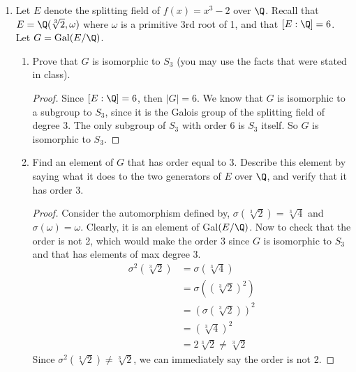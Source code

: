 \documentclass[12pt]{article}
\begin{document}
\begin{enumerate}
\begin{enumerate}
		\end{enumerate}
		
		\item Let $E$ denote the splitting field of $f(x) = x^3 - 2$ over $\Q$. Recall that $E = \Q(\sqrt[3]{2}, \omega)$ where $\omega$ is a primitive 3rd root of 1, and that $[E : \Q] = 6$. Let $G = \text{Gal}(E/\Q)$.
		\begin{enumerate}
			\item Prove that $G$ is isomorphic to $S_3$ (you may use the facts that were stated in class).
			\begin{proof}
				Since $[E:\Q] = 6$, then $|G| = 6$. We know that $G$ is isomorphic to a subgroup to $S_3$, since it is the Galois group of the splitting field of degree 3. The only subgroup of $S_3$ with order $6$ is $S_3$ itself. So $G$ is isomorphic to $S_3$.
			\end{proof}
		
			\item Find an element of $G$ that has order equal to 3. Describe this element by saying what it does to the two generators of $E$ over $\Q$, and verify that it has order 3.
			\begin{proof}
				Consider the automorphism defined by, $\sigma(\sqrt[3]{2}) = \sqrt[3]{4}$ and $\sigma(\omega)=\omega$. Clearly, it is an element of Gal$(E/\Q)$. Now to check that the order is not 2, which would make the order 3 since $G$ is isomorphic to $S_3$ and that has elements of max degree 3.\\
				\begin{align*}
					\sigma^2(\sqrt[3]{2}) &= \sigma(\sqrt[3]{4})\\
					 &= \sigma((\sqrt[3]{2})^2)\\
					 &= (\sigma(\sqrt[3]{2}))^2\\
					 &= (\sqrt[3]{4})^2\\
					 &= 2\sqrt[3]{2} \neq \sqrt[3]{2}
				\end{align*}
				Since $\sigma^2(\sqrt[3]{2}) \neq \sqrt[3]{2}$, we can immediately say the order is not 2.
			\end{proof}
		\end{enumerate}
	

\end{enumerate}
\end{document}
